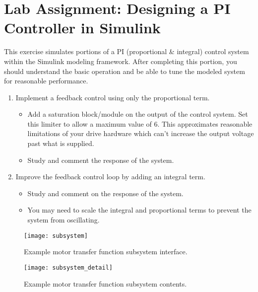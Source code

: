 \documentclass[11pt,fleqn]{book} %
\begin{document}
\section{Lab Assignment: Designing a PI Controller in Simulink}
This exercise simulates portions of a PI (proportional \& integral) control system within the Simulink modeling framework. After completing this portion, you should understand the basic operation and be able to tune the modeled system for reasonable performance. 

\begin{enumerate}
    \item Implement a feedback control using only the proportional term. 
    \begin{itemize}
        \item Add a saturation block/module on the output of the control system. Set this limiter to allow a maximum value of 6. This approximates reasonable limitations of your drive hardware which can't increase the output voltage past what is supplied.  
        \item Study and comment the response of the system.
    \end{itemize}
    \item Improve the feedback control loop by adding an integral term. 
    \begin{itemize}
        \item Study and comment on the response of the system.
        \item You may need to scale the integral and proportional terms to prevent the system from oscillating.
    \end{itemize}
    
    
\end{enumerate}




\begin{figure}[tb]
    \centering\texttt{[image: subsystem]}
    \caption{Example motor transfer function subsystem interface.}
    \label{subsystem}
\end{figure}


\begin{figure}[b]
    \begin{center}
        \hspace*{-3.4cm}
        \texttt{[image: subsystem\_detail]}
        \caption{Example motor transfer function subsystem contents.}
        \label{subsystem_detail}
    \end{center}
\end{figure}
\end{document}
